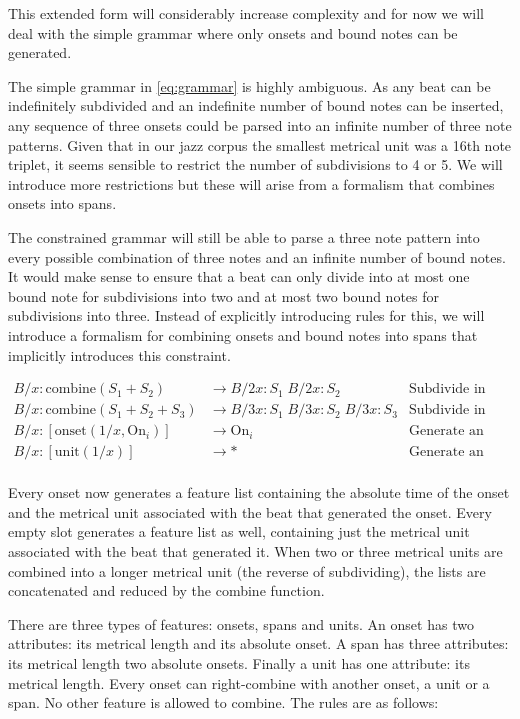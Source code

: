 \documentclass[a4paper,10pt]{article}
\begin{document}
This extended form will considerably increase complexity and for now we will deal with the simple grammar where only onsets and bound notes can be generated.

The simple grammar in \ref{eq:grammar} is highly ambiguous. As any beat can be indefinitely subdivided and an indefinite number of bound notes can be inserted, any sequence of three onsets could be parsed into an infinite number of three note patterns. Given that in our jazz corpus the smallest metrical unit was a 16th note triplet, it seems sensible to restrict the number of subdivisions to 4 or 5. We will introduce more restrictions but these will arise from a formalism that combines onsets into spans.

The constrained grammar will still be able to parse a three note pattern into every possible combination of three notes and an infinite number of bound notes. It would make sense to ensure that a beat can only divide into at most one bound note for subdivisions into two and at most two bound notes for subdivisions into three. Instead of explicitly introducing rules for this, we will introduce a formalism for combining onsets and bound notes into spans that implicitly introduces this constraint.

\begin{align*}
B/x\!:\!\textrm{combine}(S_1 + S_2) &\rightarrow B/2x\!:\!S_1 \; B/2x\!:\!S_2 &\textrm{Subdivide in two,}\\
B/x\!:\!\textrm{combine}(S_1 + S_2 + S_3) &\rightarrow B/3x:S_1 \; B/3x:S_2 \; B/3x:S_3 & \textrm{Subdivide in three,}\\
B/x\!:\![\textrm{onset}(1/x, \textrm{On}_i)]&\rightarrow \textrm{On}_i & \textrm{Generate an onset,}\\
B/x\!:\![\textrm{unit}(1/x)] &\rightarrow * & \textrm{Generate an empty slot (bound note),}\\
\end{align*}

Every onset now generates a feature list containing the absolute time of the onset and the metrical unit associated with the beat that generated the onset. Every empty slot generates a feature list as well, containing just the metrical unit associated with the beat that generated it. When two or three metrical units are combined into a longer metrical unit (the reverse of subdividing), the lists are concatenated and reduced by the combine function. 

There are three types of features: onsets, spans and units. An onset has two attributes: its metrical length and its absolute onset. A span has three attributes: its metrical length two absolute onsets. Finally a unit has one attribute: its metrical length. Every onset can right-combine with another onset, a unit or a span. No other feature is allowed to combine. The rules are as follows:
\end{document}
